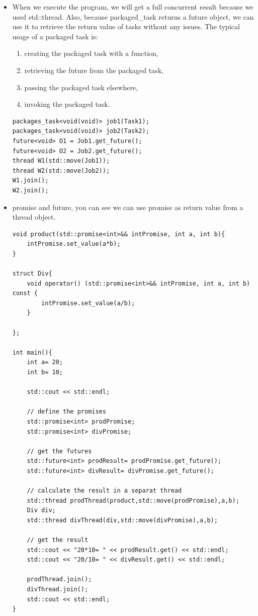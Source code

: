 \documentclass[a4paper,11pt,twoside]{book}
\begin{document}
\begin{itemize}
\item When we execute the program, we will get a full concurrent result because we used std::thread. Also, because packaged\_task returns a future object, we can use it to retrieve the return value of tasks without any issues. The typical usage of a packaged task is:
\begin{enumerate}
	\item creating the packaged task with a function,
	\item retrieving the future from the packaged task,
	\item passing the packaged task elsewhere,
	\item invoking the packaged task.
\end{enumerate}
\begin{lstlisting}[numbers=none]
packages_task<void(void)> job1(Task1);	
packages_task<void(void)> job2(Task2);	
future<void> O1 = Job1.get_future();
future<void> O2 = Job2.get_future();
thread W1(std::move(Job1));
thread W2(std::move(Job2));
W1.join();
W2.join();
\end{lstlisting}


\item promise and future, you can see we can use promise as return value from a thread object.
\begin{lstlisting}[numbers=none]
void product(std::promise<int>&& intPromise, int a, int b){
	intPromise.set_value(a*b);
}

struct Div{	
	void operator() (std::promise<int>&& intPromise, int a, int b) const {
		intPromise.set_value(a/b);
	}
	
};

int main(){	
	int a= 20;
	int b= 10;
	
	std::cout << std::endl;
	
	// define the promises
	std::promise<int> prodPromise;
	std::promise<int> divPromise;
	
	// get the futures
	std::future<int> prodResult= prodPromise.get_future();
	std::future<int> divResult= divPromise.get_future();
	
	// calculate the result in a separat thread
	std::thread prodThread(product,std::move(prodPromise),a,b);
	Div div;
	std::thread divThread(div,std::move(divPromise),a,b);
	
	// get the result
	std::cout << "20*10= " << prodResult.get() << std::endl;
	std::cout << "20/10= " << divResult.get() << std::endl;
	
	prodThread.join();	
	divThread.join();
	std::cout << std::endl;	
}	
\end{lstlisting}


\end{itemize}
\end{document}
